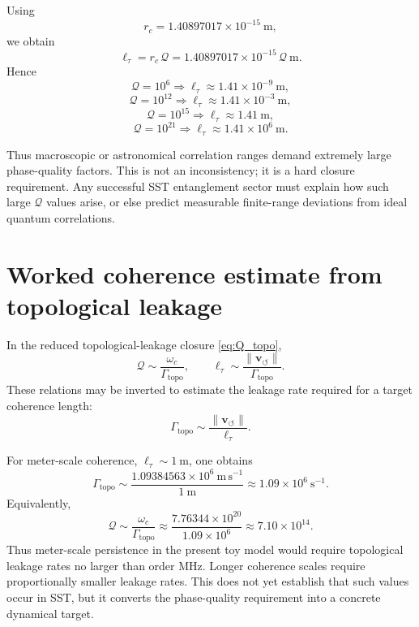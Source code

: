 \documentclass[11pt]{article}
\newcommand{\vnorm}{\lVert \mathbf{v}_{\!\boldsymbol{\circlearrowleft}}\rVert}
\newcommand{\rc}{r_c}
\begin{document}
        Using
        \[
            \rc=1.40897017\times 10^{-15}\ \mathrm{m},
        \]
        we obtain
        \[
            \ell_\tau=\rc\,\mathcal{Q}
            =
            1.40897017\times 10^{-15}\,\mathcal{Q}\ \mathrm{m}.
        \]
        Hence
        \[
            \mathcal{Q}=10^6 \Rightarrow \ell_\tau\approx 1.41\times 10^{-9}\ \mathrm{m},
        \]
        \[
            \mathcal{Q}=10^{12} \Rightarrow \ell_\tau\approx 1.41\times 10^{-3}\ \mathrm{m},
        \]
        \[
            \mathcal{Q}=10^{15} \Rightarrow \ell_\tau\approx 1.41\ \mathrm{m},
        \]
        \[
            \mathcal{Q}=10^{21} \Rightarrow \ell_\tau\approx 1.41\times 10^{6}\ \mathrm{m}.
        \]
        
        Thus macroscopic or astronomical correlation ranges demand extremely large phase-quality factors. This is not an inconsistency; it is a hard closure requirement. Any successful SST entanglement sector must explain how such large \(\mathcal{Q}\) values arise, or else predict measurable finite-range deviations from ideal quantum correlations.

    \section{Worked coherence estimate from topological leakage}

        In the reduced topological-leakage closure \cref{eq:Q_topo},
        \[
            \mathcal{Q}\sim \frac{\omega_c}{\Gamma_{\mathrm{topo}}},
            \qquad
            \ell_\tau\sim \frac{\vnorm}{\Gamma_{\mathrm{topo}}}.
        \]
        These relations may be inverted to estimate the leakage rate required for a target coherence length:
        \begin{equation}
            \Gamma_{\mathrm{topo}}
            \sim
            \frac{\vnorm}{\ell_\tau}.
            \label{eq:Gammatopo_inv}
        \end{equation}

        For meter-scale coherence, \(\ell_\tau\sim 1\ \mathrm{m}\), one obtains
        \begin{equation}
            \Gamma_{\mathrm{topo}}
            \sim
            \frac{1.09384563\times 10^6\ \mathrm{m\,s^{-1}}}{1\ \mathrm{m}}
            \approx 1.09\times 10^6\ \mathrm{s^{-1}}.
        \end{equation}
        Equivalently,
        \begin{equation}
            \mathcal{Q}\sim \frac{\omega_c}{\Gamma_{\mathrm{topo}}}
            \approx
            \frac{7.76344\times 10^{20}}{1.09\times 10^6}
            \approx 7.10\times 10^{14}.
        \end{equation}
        Thus meter-scale persistence in the present toy model would require topological leakage rates no larger than order MHz. Longer coherence scales require proportionally smaller leakage rates. This does not yet establish that such values occur in SST, but it converts the phase-quality requirement into a concrete dynamical target.
\end{document}
